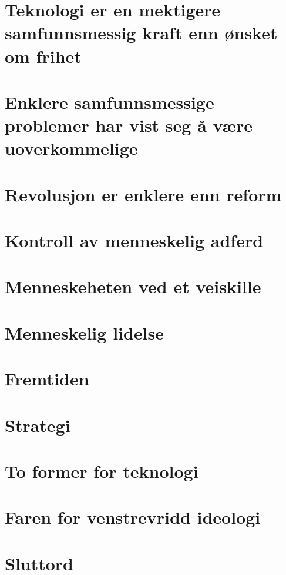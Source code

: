 \documentclass[oneside]{book}
\begin{document}
\chapter{Teknologi er en mektigere samfunnsmessig kraft enn ønsket om frihet}

\chapter{Enklere samfunnsmessige problemer har vist seg å være uoverkommelige}

\chapter{Revolusjon er enklere enn reform}

\chapter{Kontroll av menneskelig adferd}

\chapter{Menneskeheten ved et veiskille}

\chapter{Menneskelig lidelse}

\chapter{Fremtiden}

\chapter{Strategi}

\chapter{To former for teknologi}

\chapter{Faren for venstrevridd ideologi}

\chapter{Sluttord}
\end{document}
